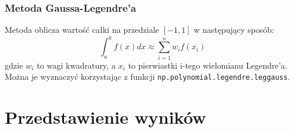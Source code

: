 \documentclass[11pt]{scrartcl}
\begin{document}
    \subsubsection{Metoda Gaussa-Legendre'a}
    Metoda oblicza wartość całki na przedziale $[-1,1]$
    w następujący sposób:
    \[
        \int_{a}^{b}f(x)dx \approx \sum_{i=1}^{n}w_if(x_i)
    \]
    gdzie $w_i$ to wagi kwadratury, a $x_i$ to pierwiastki
    i-tego wielomianu Legendre'a. Można je wyznaczyć korzystając
    z funkcji \texttt{np.polynomial.legendre.leggauss}.

    \section{Przedstawienie wyników}
    
\end{document}

